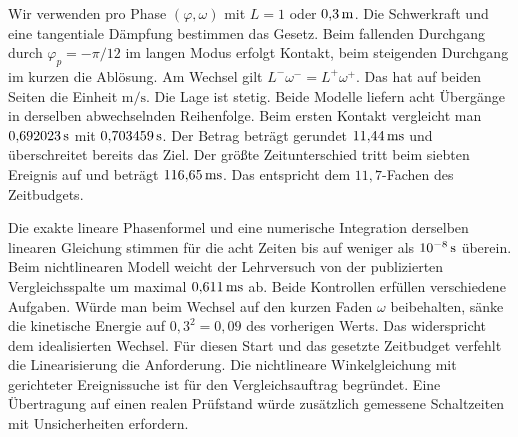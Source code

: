 Wir verwenden pro Phase \((\varphi,\omega)\) mit \(L=1\) oder \(0{,}3\,\mathrm{m}\). Die Schwerkraft und eine tangentiale Dämpfung bestimmen das Gesetz. Beim fallenden Durchgang durch \(\varphi_p=-\pi/12\) im langen Modus erfolgt Kontakt, beim steigenden Durchgang im kurzen die Ablösung. Am Wechsel gilt \(L^-\omega^-=L^+\omega^+\). Das hat auf beiden Seiten die Einheit \(\mathrm{m/s}\). Die Lage ist stetig.
Beide Modelle liefern acht Übergänge in derselben abwechselnden Reihenfolge. Beim ersten Kontakt vergleicht man \(0{,}692023\,\mathrm{s}\) mit \(0{,}703459\,\mathrm{s}\). Der Betrag beträgt gerundet \(11{,}44\,\mathrm{ms}\) und überschreitet bereits das Ziel. Der größte Zeitunterschied tritt beim siebten Ereignis auf und beträgt \(116{,}65\,\mathrm{ms}\). Das entspricht dem \(11{,}7\)-Fachen des Zeitbudgets.

Die exakte lineare Phasenformel und eine numerische Integration derselben linearen Gleichung stimmen für die acht Zeiten bis auf weniger als \(10^{-8}\,\mathrm{s}\) überein. Beim nichtlinearen Modell weicht der Lehrversuch von der publizierten Vergleichsspalte um maximal \(0{,}611\,\mathrm{ms}\) ab. Beide Kontrollen erfüllen verschiedene Aufgaben.
Würde man beim Wechsel auf den kurzen Faden \(\omega\) beibehalten, sänke die kinetische Energie auf \(0{,}3^2=0{,}09\) des vorherigen Werts. Das widerspricht dem idealisierten Wechsel. Für diesen Start und das gesetzte Zeitbudget verfehlt die Linearisierung die Anforderung. Die nichtlineare Winkelgleichung mit gerichteter Ereignissuche ist für den Vergleichsauftrag begründet. Eine Übertragung auf einen realen Prüfstand würde zusätzlich gemessene Schaltzeiten mit Unsicherheiten erfordern.

